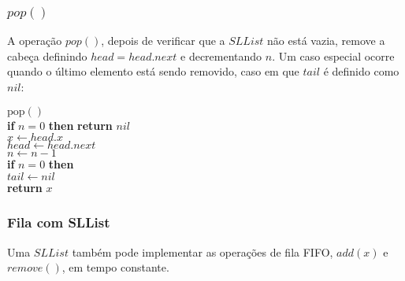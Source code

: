 \documentclass{beamer}
\begin{document}
\begin{frame}
\frametitle{$pop()$}
A operação $pop()$, depois de verificar que a $SLList$ não está vazia, remove a cabeça definindo $head=head.next$ e decrementando $n$. Um caso especial ocorre quando o último elemento está sendo removido, 
caso em que $tail$ é definido como $nil$:

\begin{framed}
\begin{flushleft}
\hspace*{1em} \ensuremath{\mathrm{pop}()}\\
\hspace*{1em} \hspace*{1em} {\color{black} \textbf{if}} \ensuremath{\ensuremath{\mathit{n}} = 0} {\color{black} \textbf{then}}  {\color{black} \textbf{return}} \ensuremath{\ensuremath{\mathit{nil}}}\\
\hspace*{1em} \hspace*{1em} \ensuremath{\ensuremath{\mathit{x}} \gets  \ensuremath{\ensuremath{\mathit{head}}.x}}\\
\hspace*{1em} \hspace*{1em} \ensuremath{\ensuremath{\mathit{head}} \gets  \ensuremath{\ensuremath{\mathit{head}}.next}}\\
\hspace*{1em} \hspace*{1em} \ensuremath{\ensuremath{\mathit{n}} \gets  \ensuremath{\ensuremath{\mathit{n}} - 1}}\\
\hspace*{1em} \hspace*{1em} {\color{black} \textbf{if}} \ensuremath{\ensuremath{\mathit{n}} = 0} {\color{black} \textbf{then}} \\
\hspace*{1em} \hspace*{1em} \hspace*{1em} \ensuremath{\ensuremath{\mathit{tail}} \gets  \ensuremath{nil}}\\
\hspace*{1em} \hspace*{1em} {\color{black} \textbf{return}} \ensuremath{\ensuremath{\mathit{x}}}\\
\end{flushleft}
\end{framed} 
\end{frame}

\begin{frame}
\frametitle{Fila com SLList}
Uma $ SLList $ também pode implementar as operações de fila FIFO, $add(x)$ e $remove()$, em tempo constante.
\end{frame}
\end{document}
